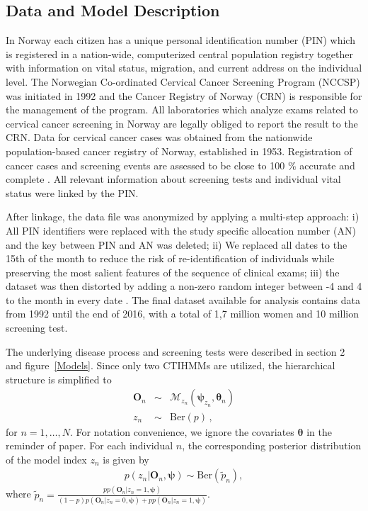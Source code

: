 \documentclass{article}
\begin{document}
\subsection{Data and Model Description}
In Norway each citizen has a unique personal identification number (PIN) which is registered in a nation-wide, computerized central population registry together with information on vital status, migration, and current address on the individual level. The Norwegian Co-ordinated Cervical Cancer Screening Program (NCCSP) was initiated in 1992 and the Cancer Registry of Norway (CRN) is responsible for the management of the program. All laboratories which analyze exams related to cervical cancer screening in Norway are legally obliged to report the result  to the CRN. Data for cervical cancer cases was obtained from the nationwide population-based cancer registry of Norway, established in 1953. Registration of cancer cases and screening events are assessed to be close to 100 \% accurate and complete  \cite{Larsen_2009, Leinonen_2018}. All relevant information about screening tests and individual vital status were linked by the PIN.

After linkage, the data file was anonymized by applying a multi-step approach: i) All PIN identifiers were replaced with the study specific allocation number (AN) and the key between PIN and AN was deleted; ii) We replaced all dates to the 15th of the month to reduce the risk of re-identification of individuals while preserving the most salient features of the sequence of clinical exams; iii) the dataset was then distorted by adding a non-zero random integer between -4 and 4 to the month in every date \cite{Ursin_2017}. The final dataset available for analysis contains data from 1992 until the end of 2016, with a total of 1,7 million women and 10 million screening test. 


The  underlying disease process and screening tests were described in section 2 and figure~\ref{Models}. Since only two CTIHMMs are utilized, the hierarchical structure is simplified to 
\begin{eqnarray}
\bm O_n & \sim & \mathcal{M}_{z_n}(\bm \psi_{z_n}, \bm \theta_n) \nonumber \\
z_n & \sim & \mathrm{Ber}(p)\,, \nonumber
\end{eqnarray}
for $n = 1, \ldots, N$. For notation convenience, we ignore the covariates $\bm \theta$ in the reminder of paper.
For each individual $n$, the corresponding posterior distribution of the model index $z_n$ is given by 
\begin{eqnarray*}
	p(z_n | \bm O_n, \bm \psi) \sim \mathrm{Ber}(\tilde{p}_n),
\end{eqnarray*}
where  $\tilde{p}_n = \frac{p p(\bm O_n| z_n = 1, \bm{\psi})}{(1-p)p(\bm O_n| z_n = 0, \bm{\psi}) + p p(\bm O_n| z_n = 1, \bm{\psi})}$.
\end{document}
